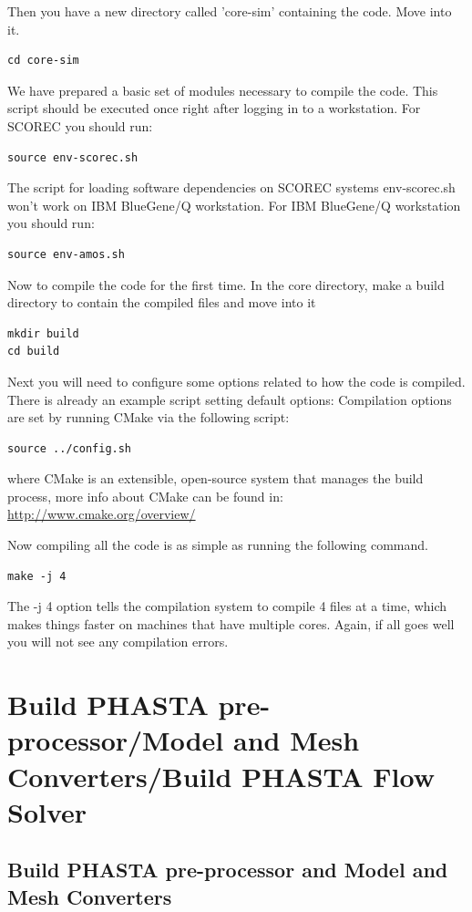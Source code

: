 \documentclass{article}
\begin{document}
Then you have a new directory called 'core-sim' containing the code. Move into it.
\begin{lstlisting}
cd core-sim
\end{lstlisting}

We have prepared a basic set of modules necessary to compile the code. This script should be executed once right after logging in to a workstation. For SCOREC you should run:
\begin{lstlisting}
source env-scorec.sh
\end{lstlisting}
The script for loading software dependencies on SCOREC systems env-scorec.sh won't work on IBM BlueGene/Q workstation. For IBM BlueGene/Q workstation you should run:
\begin{lstlisting}
source env-amos.sh
\end{lstlisting}

Now to compile the code for the first time. In the core directory, make a build directory to contain the compiled files and move into it
\begin{lstlisting} 
mkdir build
cd build
\end{lstlisting}

Next you will need to configure some options related to how the code is compiled. There is already an example script setting default options:
Compilation options are set by running CMake via the following script:
\begin{lstlisting}
source ../config.sh
\end{lstlisting}
where CMake is an extensible, open-source system that manages the build process, more info about CMake can be found in:\\
\url{http://www.cmake.org/overview/}

Now compiling all the code is as simple as running the following command.
\begin{lstlisting}
make -j 4
\end{lstlisting}

The -j 4 option tells the compilation system to compile 4 files at a time, which makes things faster on machines that have multiple cores.
Again, if all goes well you will not see any compilation errors.

\section{Build PHASTA pre-processor/Model and Mesh Converters/Build PHASTA Flow Solver}
\label{ch:2}
\subsection{Build PHASTA pre-processor and Model and Mesh Converters}
\end{document}
